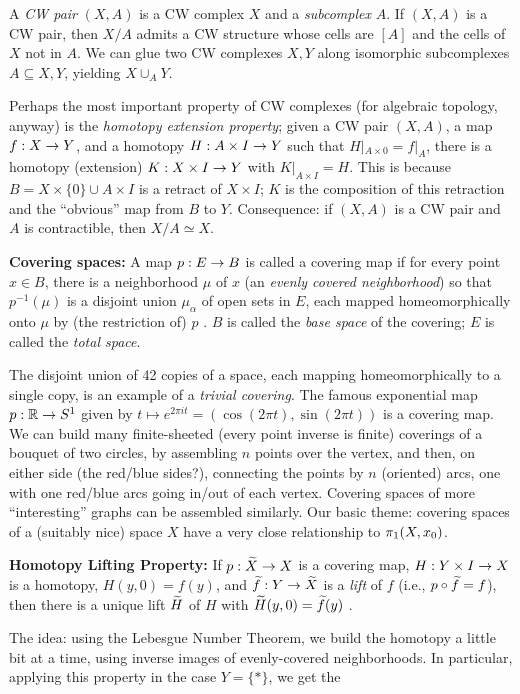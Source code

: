 \documentclass[12pt]{article}
\begin{document}
A {\it CW pair} $(X,A)$ is a CW complex $X$ and a {\it subcomplex}
$A$. If $(X,A)$ is a CW pair, then
$X/A$ admits a CW structure whose cells are $[A]$ and the cells of 
$X$ not in $A$. We can glue two CW complexes $X,Y$ along isomorphic
subcomplexes $A\subseteq X,Y$, yielding $X\cup_AY$.

Perhaps the most important property of CW complexes (for algebraic topology,
anyway) is the {\it homotopy extension property}; given a CW pair
$(X,A)$, a map $f:X\rightarrow Y$, and a homotopy $H:A\times I\rightarrow Y$ such that
$H|_{A\times 0}=f|_A$, there is a homotopy (extension)
$K:X\times I\rightarrow Y$ with $K|_{A\times I}=H$. This is because 
$B=X\times\{0\}\cup A\times I$ is a retract of $X\times I$; $K$ is the 
composition of this retraction and the ``obvious'' map from $B$ to $Y$.
Consequence: if $(X,A)$ is a CW pair and 
$A$ is contractible, then $X/A\simeq X$.

\msk

{\bf Covering spaces:} 
A map $p:E\rightarrow B$ is called a covering map if for every point $x\in B$, there
is a neighborhood $\mu$ of $x$ (an
{\it evenly covered neighborhood}) so that $p^{-1}(\mu)$ 
is a disjoint union $\mu_\alpha$ of open sets in $E$, each mapped
homeomorphically onto $\mu$ by (the restriction of) $p$ . $B$ is
called the {\it base space} of the covering; $E$ is called the {\it total
space}. 

The disjoint union of 42 copies of a space,
each mapping homeomorphically to a single copy, is an example of a 
{\it trivial covering}. 
The famous 
exponential map $p:{\mathbb R}\rightarrow S^1$ given by $t\mapsto e^{2\pi it} = 
(\cos (2\pi t),\sin (2\pi t))$ is a covering map.
We can build many finite-sheeted (every point
inverse is finite) coverings of a bouquet of two circles, by 
assembling $n$ points over the vertex, and then, on either side (the red/blue
sides?),
connecting the points by $n$ (oriented) arcs, one with one red/blue arcs going
in/out of
each vertex. 
Covering spaces of more ``interesting'' graphs can be assembled similarly.
Our basic theme: covering spaces of a (suitably nice) space $X$ have a very close relationship
to $\pi_1(X,x_0)$. 

\ssk

{\bf Homotopy Lifting Property:} If $p:\widetilde{X}\rightarrow X$ is a covering map, 
$H:Y\times I\rightarrow X$ is a homotopy, $H(y,0)=f(y)$, and
$\widetilde{f}:Y\rightarrow \widetilde{X}$ is a {\it lift} of $f$ (i.e., $p\circ \widetilde{f}=f$),
then there is a unique lift $\widetilde{H}$ of $H$ with $\widetilde{H}(y,0)=\widetilde{f}(y)$ .

The idea: using the Lebesgue Number Theorem, we build the homotopy a little 
bit at a time, using inverse images of evenly-covered neighborhoods.
In particular, applying this property in the case $Y=\{*\}$, we get the
\end{document}
